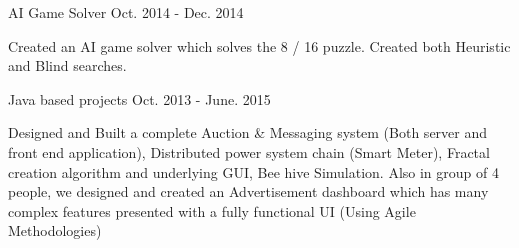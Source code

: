 \begin{cventries}
	
	
	
	\cvmyentry
	{AI Game Solver} %
	{\vspace{-2.0mm} Oct. 2014 - Dec. 2014} %
	{	\vspace*{-\baselineskip} \vspace{+2.0mm}
		\begin{cvitems} %
			Created an AI game solver which solves the 8 / 16 puzzle. Created both Heuristic and Blind searches.
		\end{cvitems}
	}
	

	
	
	\cvmyentry
	{Java based projects} %
	{\vspace{-2.0mm} Oct. 2013 - June. 2015} %
	{	\vspace*{-\baselineskip} \vspace{+2.0mm}
		\begin{cvitems} %
				Designed and Built a complete Auction \& Messaging system (Both server and front end application), Distributed power system chain (Smart Meter), Fractal creation algorithm and underlying GUI, Bee hive Simulation. Also in group of 4 people, we designed and created an Advertisement dashboard which has many complex features presented with a fully functional UI (Using Agile Methodologies)
		\end{cvitems}
	}
	

	
\end{cventries}
